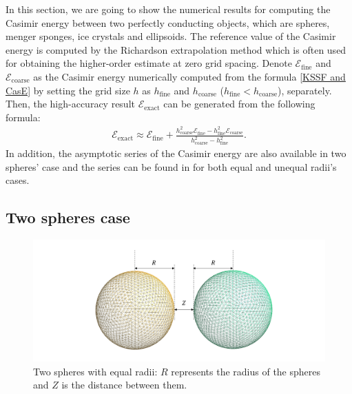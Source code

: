 In this section, we are going to show the numerical results for computing the Casimir energy between two perfectly conducting objects, which are spheres, 
menger sponges, ice crystals and ellipsoids. The reference value of the Casimir energy is computed by the Richardson extrapolation method which is often used 
for obtaining the higher-order estimate at zero grid spacing. Denote $\mathcal{E}_{\text{fine}}$ and $\mathcal{E}_{\text{coarse}}$ as the Casimir energy 
numerically computed from the formula \eqref{KSSF and CasE} by setting the grid size $h$ as $h_{\text{fine}}$ and $h_{\text{coarse}}$ 
($h_{\text{fine}}<h_{\text{coarse}}$), separately. Then, the high-accuracy result $\mathcal{E}_{\text{exact}}$ can be generated from the following formula:
\begin{align}\label{Richardson extrapolation}
    \mathcal{E}_{\text{exact}} \approx \mathcal{E}_{\text{fine}} + \frac{h_{\text{coarse}}^{2}\mathcal{E}_{\text{fine}} - h_{\text{fine}}^{2}\mathcal{E}_{\text{coarse}}}{h_{\text{coarse}}^{2} - h_{\text{fine}}^{2}}.
\end{align}
In addition, the asymptotic series of the Casimir energy are also available in two spheres' case and the series can be found in \cite{emig2008casimir} 
for both equal and unequal radii's cases. 

\subsection{Two spheres case}
\begin{figure}[H]
    \hspace*{3cm}\includegraphics[scale = 0.6]{figures/Grid_two_spheres_dist.png}
    \caption{Two spheres with equal radii: $R$ represents the radius of the spheres and $Z$ is the distance between them.}
    \label{Two spheres with equal radii}
\end{figure}

